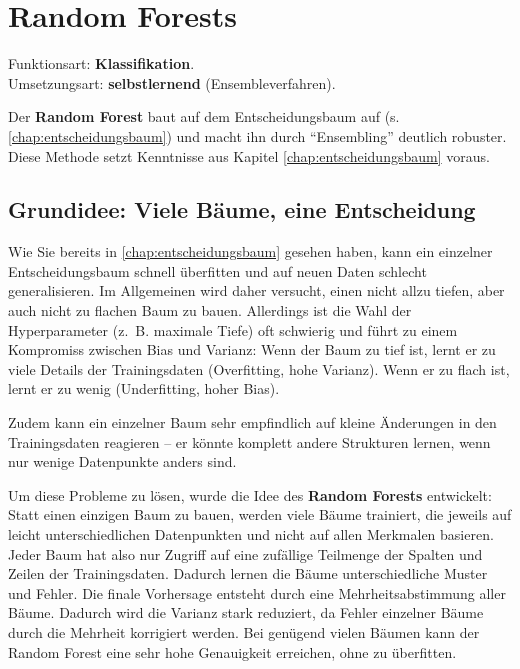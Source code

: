\chapter{Random Forests}
\label{chap:randomforest}

\begin{myremark}
    Funktionsart: \textbf{Klassifikation}. \\
    Umsetzungsart: \textbf{selbstlernend} (Ensembleverfahren).
\end{myremark}

\begin{myremark}
    Der \textbf{Random Forest} baut auf dem Entscheidungsbaum auf (s. \cref{chap:entscheidungsbaum}) und macht ihn
    durch \enquote{Ensembling} deutlich robuster. Diese Methode setzt Kenntnisse aus Kapitel \cref{chap:entscheidungsbaum} voraus.
\end{myremark}

\section{Grundidee: Viele Bäume, eine Entscheidung}

Wie Sie bereits in \cref{chap:entscheidungsbaum} gesehen haben, kann ein einzelner Entscheidungsbaum schnell überfitten und auf neuen Daten schlecht generalisieren. Im Allgemeinen wird daher versucht, einen nicht allzu tiefen, aber auch nicht zu flachen Baum zu bauen. Allerdings ist die Wahl der Hyperparameter (z.~B. maximale Tiefe) oft schwierig und führt zu einem Kompromiss zwischen Bias und Varianz: Wenn der Baum zu tief ist, lernt er zu viele Details der Trainingsdaten (Overfitting, hohe Varianz). Wenn er zu flach ist, lernt er zu wenig (Underfitting, hoher Bias).

Zudem kann ein einzelner Baum sehr empfindlich auf kleine Änderungen in den Trainingsdaten reagieren -- er könnte komplett andere Strukturen lernen, wenn nur wenige Datenpunkte anders sind.

Um diese Probleme zu lösen, wurde die Idee des \textbf{Random Forests} entwickelt: Statt einen einzigen Baum zu bauen, werden viele Bäume trainiert, die jeweils auf leicht unterschiedlichen Datenpunkten und nicht auf allen Merkmalen basieren. Jeder Baum hat also nur Zugriff auf eine zufällige Teilmenge der Spalten und Zeilen der Trainingsdaten. Dadurch lernen die Bäume unterschiedliche Muster und Fehler. Die finale Vorhersage entsteht durch eine Mehrheitsabstimmung aller Bäume. Dadurch wird die Varianz stark reduziert, da Fehler einzelner Bäume durch die Mehrheit korrigiert werden. Bei genügend vielen Bäumen kann der Random Forest eine sehr hohe Genauigkeit erreichen, ohne zu überfitten.

